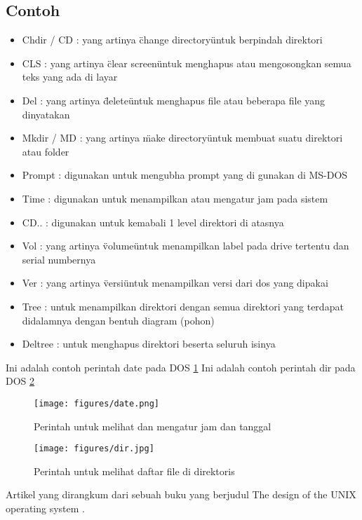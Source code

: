 		\subsection{Contoh}
		\begin{itemize}
			\item Chdir / CD : yang artinya \"change directory\" untuk berpindah direktori
			\item CLS : yang artinya \"clear screen\" untuk menghapus atau mengosongkan semua teks yang ada di layar
			\item Del : yang artinya \"delete\" untuk menghapus file atau beberapa file yang dinyatakan
			\item Mkdir / MD : yang artinya \"make directory\" untuk membuat suatu direktori atau folder
			\item Prompt : digunakan untuk mengubha prompt yang di gunakan di MS-DOS
			\item Time : digunakan untuk menampilkan atau mengatur jam pada sistem
			\item CD.. : digunakan untuk kemabali 1 level direktori di atasnya
			\item Vol : yang artinya \"volume\" untuk menampilkan label pada drive tertentu dan serial numbernya
			\item Ver : yang artinya \"versi\" untuk menampilkan versi dari dos yang dipakai
			\item Tree : untuk menampilkan direktori dengan semua direktori yang terdapat didalamnya dengan bentuh diagram (pohon)
			\item Deltree : untuk menghapus direktori beserta seluruh isinya
		\end{itemize}
		Ini adalah contoh perintah date pada DOS \ref{date}
		Ini adalah contoh perintah dir pada DOS \ref{dir}
			\begin{figure}[ht]
			\centerline{\texttt{[image: figures/date.png]}}
			\caption{Perintah untuk melihat dan mengatur jam dan tanggal}
			\label{date}
			\end{figure}
			
			\begin{figure}[ht]
			\centerline{\texttt{[image: figures/dir.jpg]}}
			\caption{Perintah untuk melihat daftar file di direktoris}
			\label{dir}
			\end{figure}
			
\newpage

	\vspace*{1,5cm}Artikel yang dirangkum dari sebuah buku yang berjudul The design of the UNIX operating system \cite{bach1986design}.
		

